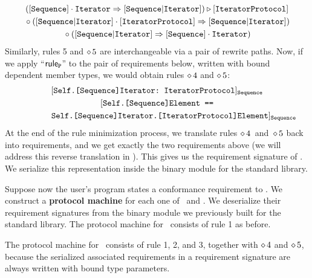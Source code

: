 \documentclass[../generics]{subfiles}
\begin{document}
\begin{example}
\begin{gather*}
([\texttt{Sequence}]\cdot\texttt{Iterator} \Rightarrow [\texttt{Sequence}|\texttt{Iterator}]) \triangleright [\texttt{IteratorProtocol}]\\
{} \circ ([\texttt{Sequence}|\texttt{Iterator}]\cdot[\texttt{IteratorProtocol}] \Rightarrow [\texttt{Sequence}|\texttt{Iterator}])\\
{} \circ ([\texttt{Sequence}|\texttt{Iterator}] \Rightarrow [\texttt{Sequence}]\cdot\texttt{Iterator})
\end{gather*}
Similarly, rules 5 and $\diamond\, 5$ are interchangeable via a pair of rewrite paths. Now, if we apply ``$\mathsf{rule}_{\texttt{P}}$'' to the pair of requirements below, written with bound dependent member types, we would obtain rules $\diamond\, 4$ and $\diamond\, 5$:
\begin{gather*}
[\texttt{Self.[Sequence]Iterator:~IteratorProtocol}]_{\texttt{Sequence}}\\
[\texttt{Self.[Sequence]Element ==}\\
\qquad\qquad\texttt{Self.[Sequence]Iterator.[IteratorProtocol]Element}]_{\texttt{Sequence}}
\end{gather*}
At the end of the rule minimization process, we translate rules $\diamond\, 4$~and~$\diamond\, 5$ back into requirements, and we get exactly the two requirements above (we will address this reverse translation in ). This gives us the requirement signature of \tSequence. We serialize this representation inside the binary module for the standard library.
\end{example}

\begin{example}
Suppose now the user's program states a conformance requirement to \tSequence. We construct a \textbf{protocol machine} for each one of \tIterator\ and \tSequence. We deserialize their requirement signatures from the binary module we previously built for the standard library. The protocol machine for \tIterator\ consists of rule 1 as before.

The protocol machine for \tSequence\ consists of rule 1, 2, and 3, together with $\diamond\, 4$ and $\diamond\, 5$, because the serialized associated requirements in a requirement signature are always written with bound type parameters.
\end{example}
\end{document}
